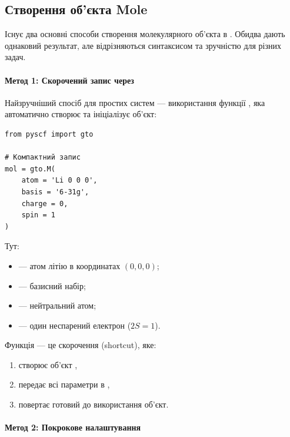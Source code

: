 \subsection{Створення об'єкта Mole}

Існує два основні способи створення молекулярного об'єкта в \PySCF.
Обидва дають однаковий результат, але відрізняються синтаксисом та зручністю для різних задач.

\paragraph{Метод 1: Скорочений запис через }

Найзручніший спосіб для простих систем --- використання функції ,
яка автоматично створює та ініціалізує об'єкт:

\begin{verbatim}
from pyscf import gto

# Компактний запис
mol = gto.M(
    atom = 'Li 0 0 0',
    basis = '6-31g',
    charge = 0,
    spin = 1
)
\end{verbatim}

Тут:
\begin{itemize}
	\item {} --- атом літію в координатах $(0, 0, 0)$;
	\item {} --- базисний набір;
	\item {} --- нейтральний атом;
	\item {} --- один неспарений електрон ($2S = 1$).
\end{itemize}

Функція  --- це скорочення (shortcut), яке:
\begin{enumerate}
	\item створює об'єкт ,
	\item передає всі параметри в ,
	\item повертає готовий до використання об'єкт.
\end{enumerate}

\paragraph{Метод 2: Покрокове налаштування}

